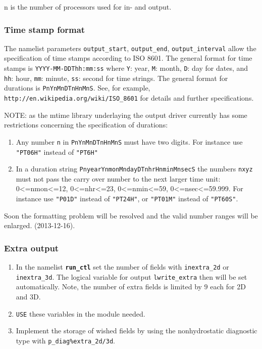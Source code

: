 n is the number of processors used for in- and output. 



\subsubsection{Time stamp format}


The namelist parameters \texttt{output\_start}, \texttt{output\_end}, \texttt{output\_interval} allow
the specification of time stamps according to ISO 8601.
The general format for time stamps is \texttt{YYYY-MM-DDThh:mm:ss}
where \texttt{Y}: year, \texttt{M}: month, \texttt{D}: day for dates, 
and   \texttt{hh}: hour, \texttt{mm}: minute, \texttt{ss}: second for time strings.  
The general format for durations is \texttt{PnYnMnDTnHnMnS}.
See, for example, \texttt{http://en.wikipedia.org/wiki/ISO\_8601} for details and further specifications.

\color{red}NOTE: as the mtime library underlaying the output driver
  currently has some restrictions concerning the specification of durations:\begin{enumerate}
\item Any number \texttt{n} in \texttt{PnYnMnDTnHnMnS} must have two digits. For instance use \texttt{"PT06H"} instead of \texttt{"PT6H"}
\item In a duration string \texttt{PnyearYnmonMndayDTnhrHnminMnsecS} the numbers \texttt{nxyz} must not pass the carry over number to the next larger time unit: 0<=nmon<=12, 0<=nhr<=23, 0<=nmin<=59, 0<=nsec<=59.999. For instance use \texttt{"P01D"} instead of \texttt{"PT24H"}, or \texttt{"PT01M"} instead of \texttt{"PT60S"}.
\end{enumerate}

Soon the formatting problem will be resolved and the valid number ranges will be enlarged.
(2013-12-16).\color{black}



\subsubsection{Extra output}


\begin{enumerate} 
\item In the namelist {\bf \texttt{run\_ctl}} set the number of fields with \texttt{inextra\_2d} or
  \texttt{inextra\_3d}. The logical variable for output
  \texttt{lwrite\_extra} then will be set automatically. Note, the
  number of extra fields is limited by $9$ each for 2D and 3D.
\item  \texttt{USE} these variables in the module needed.
\item Implement the storage of wished fields by using the
  nonhydrostatic diagnostic type with
  \texttt{p\_diag\%extra\_2d/3d}. 
\end{enumerate} 


